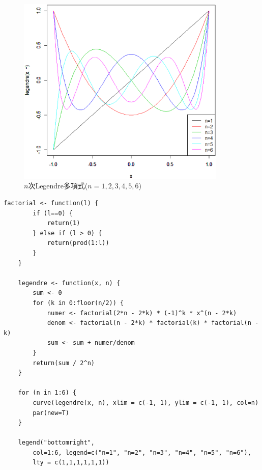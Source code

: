 \documentclass[a4j,papersize,disablejfam,slide,14pt]{jsarticle}
\begin{document}
    \begin{figure}[H]
        \begin{center}
    	\includegraphics[clip,width = 10.0cm]{graphics/legendre.eps}
        \end{center}
        \caption{$n$次{\rm Legendre}多項式($n=1,2,3,4,5,6$)}
    \end{figure}
    \begin{lstlisting}[style=customR]
    factorial <- function(l) {
    	if (l==0) {
			return(1)
    	} else if (l > 0) {
			return(prod(1:l))
		}
	}
	
	legendre <- function(x, n) {
		sum <- 0
		for (k in 0:floor(n/2)) {
			numer <- factorial(2*n - 2*k) * (-1)^k * x^(n - 2*k)
			denom <- factorial(n - 2*k) * factorial(k) * factorial(n - k)
			sum <- sum + numer/denom
		}
		return(sum / 2^n)
	}
	
	for (n in 1:6) {
		curve(legendre(x, n), xlim = c(-1, 1), ylim = c(-1, 1), col=n)
		par(new=T)
	}
	
	legend("bottomright",
    	col=1:6, legend=c("n=1", "n=2", "n=3", "n=4", "n=5", "n=6"),
        lty = c(1,1,1,1,1,1))
    \end{lstlisting}
    
\end{document}
